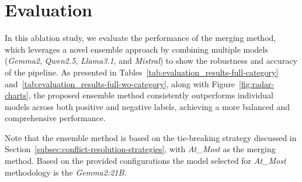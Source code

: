 \section{Evaluation}\label{sec:evaluation-and-discussion}
In this ablation study, we evaluate the performance of the merging method, which leverages a novel ensemble approach by combining multiple models (\textit{Gemma2}, \textit{Qwen2.5}, \textit{Llama3.1}, and \textit{Mistral}) to show the robustness and accuracy of the pipeline.
As presented in Tables~\ref{tab:evaluation_results-full-category} and~\ref{tab:evaluation_results-full-wo-category}, along with Figure~\ref{fig:radar-charts}, the proposed ensemble method consistently outperforms individual models across both positive and negative labels, achieving a more balanced and comprehensive performance.

Note that the ensemble method is based on the tie-breaking strategy discussed in Section~\ref{subsec:conflict-resolution-strategies}, with \textit{At\_Most} as the merging method.
Based on the provided configurations the model selected for \textit{At\_Most} methodology is the \textit{Gemma2:21B}.

